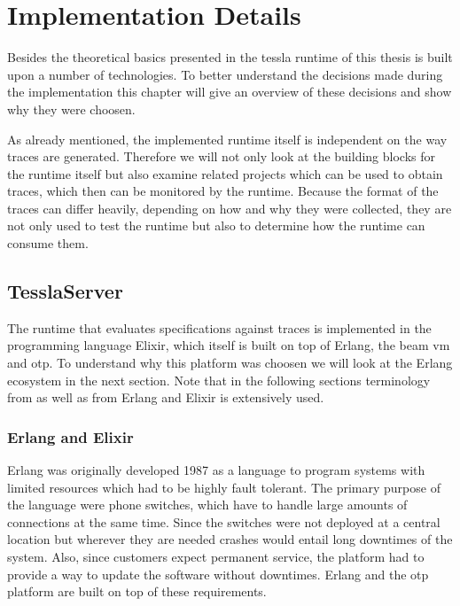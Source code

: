 %
\chapter{Implementation Details}
\label{sec:implementation}

Besides the theoretical basics presented in  the \gls{tessla} runtime of this thesis is built upon a number of technologies.
To better understand the decisions made during the implementation this chapter will give an overview of these decisions and show why they were choosen.

As already mentioned, the implemented runtime itself is independent on the way traces are generated.
Therefore we will not only look at the building blocks for the runtime itself but also examine related projects which can be used to obtain traces, which then can be monitored by the runtime.
Because the format of the traces can differ heavily, depending on how and why they were collected, they are not only used to test the runtime but also to determine how the runtime can consume them.

\section{TesslaServer}
\label{sec:implementation:tesslaserver}

The runtime that evaluates specifications against traces is implemented in the programming language Elixir, which itself is built on top of Erlang, the \gls{beam} \gls{vm} and \gls{otp}.
To understand why this platform was choosen we will look at the Erlang ecosystem in the next section.
Note that in the following sections terminology from  as well as from Erlang and Elixir is extensively used.

\subsection{Erlang and Elixir}
\label{sec:implementation:tesslaserver:erlang_elixir}

Erlang was originally developed 1987 as a language to program systems with limited resources which had to be highly fault tolerant.
The primary purpose of the language were phone switches, which have to handle large amounts of connections at the same time.
Since the switches were not deployed at a central location but wherever they are needed crashes would entail long downtimes of the system.
Also, since customers expect permanent service, the platform had to provide a way to update the software without downtimes.
Erlang and the \gls{otp} platform are built on top of these requirements.

